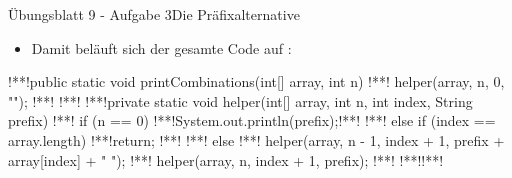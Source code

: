 \begin{frame}[fragile]{Übungsblatt 9 - Aufgabe 3\hfill Die Präfixalternative}
    \null\vspace*{.65cm}\begin{itemize}[<+(1)->]
        \item Damit beläuft sich der gesamte Code auf :
    \end{itemize}
\begin{plainjava}
!**!public static void printCombinations(int[] array, int n) {
!**!    helper(array, n, 0, "");
!**!}
!**!
!**!private static void helper(int[] array, int n, int index, String prefix) {
!**!    if (n == 0) { !**!System.out.println(prefix);!**! }
!**!    else if (index == array.length) { !**!return; !**!}
!**!    else {
!**!        helper(array, n - 1, index + 1, prefix + array[index] + " ");
!**!        helper(array, n, index + 1, prefix);
!**!    }
!**!}!**!
\end{plainjava}
\end{frame}

